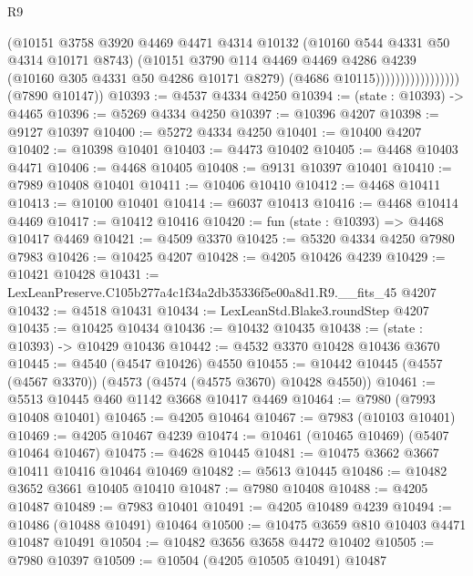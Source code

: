 \begin{lexlean}{R9}
\begin{coremodule}
                                  (@10151
                                    @3758
                                    @3920
                                    @4469
                                    @4471
                                    @4314
                                    @10132
                                    (@10160 @544 @4331 @50 @4314 @10171 @8743)
                                    (@10151
                                      @3790
                                      @114
                                      @4469
                                      @4469
                                      @4286
                                      @4239
                                      (@10160 @305 @4331 @50 @4286 @10171 @8279)
                                      (@4686 @10115)))))))))))))))))
      (@7890 @10147))
@10393 := @4537 @4334 @4250
@10394 := (state : @10393) -> @4465
@10396 := @5269 @4334 @4250
@10397 := @10396 @4207
@10398 := @9127 @10397
@10400 := @5272 @4334 @4250
@10401 := @10400 @4207
@10402 := @10398 @10401
@10403 := @4473 @10402
@10405 := @4468 @10403 @4471
@10406 := @4468 @10405
@10408 := @9131 @10397 @10401
@10410 := @7989 @10408 @10401
@10411 := @10406 @10410
@10412 := @4468 @10411
@10413 := @10100 @10401
@10414 := @6037 @10413
@10416 := @4468 @10414 @4469
@10417 := @10412 @10416
@10420 := fun (state : @10393) => @4468 @10417 @4469
@10421 := @4509 @3370
@10425 := @5320 @4334 @4250 @7980 @7983
@10426 := @10425 @4207
@10428 := @4205 @10426 @4239
@10429 := @10421 @10428
@10431 := LexLeanPreserve.C105b277a4c1f34a2db35336f5e00a8d1.R9.__fits_45 @4207
@10432 := @4518 @10431
@10434 := LexLeanStd.Blake3.roundStep @4207
@10435 := @10425 @10434
@10436 := @10432 @10435
@10438 := (state : @10393) -> @10429 @10436
@10442 := @4532 @3370 @10428 @10436 @3670
@10445 := @4540 (@4547 @10426) @4550
@10455 := @10442 @10445 (@4557 (@4567 @3370)) (@4573 (@4574 (@4575 @3670) @10428 @4550))
@10461 := @5513 @10445 @460 @1142 @3668 @10417 @4469
@10464 := @7980 (@7993 @10408 @10401)
@10465 := @4205 @10464
@10467 := @7983 (@10103 @10401)
@10469 := @4205 @10467 @4239
@10474 := @10461 (@10465 @10469) (@5407 @10464 @10467)
@10475 := @4628 @10445
@10481 := @10475 @3662 @3667 @10411 @10416 @10464 @10469
@10482 := @5613 @10445
@10486 := @10482 @3652 @3661 @10405 @10410
@10487 := @7980 @10408
@10488 := @4205 @10487
@10489 := @7983 @10401
@10491 := @4205 @10489 @4239
@10494 := @10486 (@10488 @10491) @10464
@10500 := @10475 @3659 @810 @10403 @4471 @10487 @10491
@10504 := @10482 @3656 @3658 @4472 @10402
@10505 := @7980 @10397
@10509 := @10504 (@4205 @10505 @10491) @10487

\end{coremodule}
\end{lexlean}
